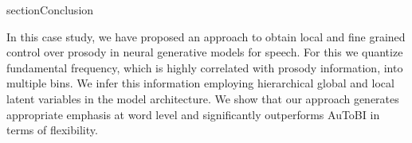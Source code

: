 
section{Conclusion}

In this case study, we have proposed an approach to obtain local and fine grained control over prosody in neural generative models for speech. For this we quantize fundamental frequency, which is highly correlated with prosody information, into multiple bins. We infer this information employing hierarchical global and local latent variables in the model architecture.  We show that our approach generates appropriate emphasis at word level and significantly outperforms AuToBI in terms of flexibility.  
